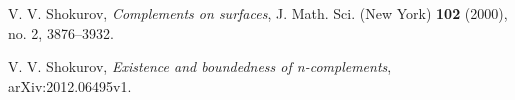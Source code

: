 \documentclass[11pt]{amsart}
\numberwithin{equation}{section}
\theoremstyle{definition}
\theoremstyle{definition}
\begin{document}
\begin{thebibliography}{99}
 V. V. Shokurov, 
\textit{Complements on surfaces}, J. Math. Sci. (New York) \textbf{102} (2000), no. 2, 3876--3932.


 V. V. Shokurov,
\textit{Existence and boundedness of n-complements}, arXiv:2012.06495v1.







\end{thebibliography}
\end{document}
